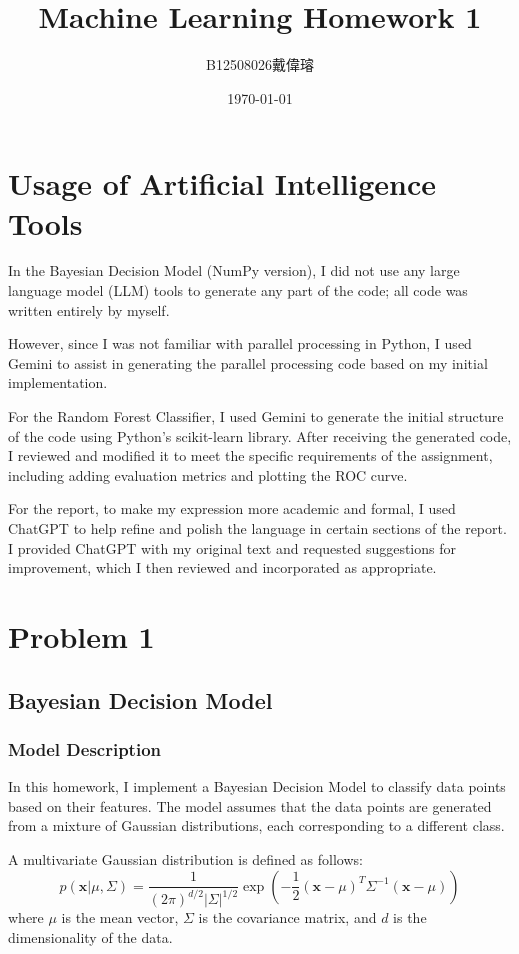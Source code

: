 \documentclass[12pt,a4paper]{article}
\title{Machine Learning Homework 1}
\author{B12508026戴偉璿}
\date{\today}
\begin{document}
\maketitle

\newpage
\tableofcontents
\newpage
\section*{Usage of Artificial Intelligence Tools}
In the Bayesian Decision Model (NumPy version), I did not use any large language model (LLM) tools to generate any part of the code; all code was written entirely by myself.

However, since I was not familiar with parallel processing in Python, I used Gemini to assist in generating the parallel processing code based on my initial implementation.

For the Random Forest Classifier, I used Gemini to generate the initial structure of the code using Python's scikit-learn library. After receiving the generated code, I reviewed and modified it to meet the specific requirements of the assignment, including adding evaluation metrics and plotting the ROC curve.

For the report, to make my expression more academic and formal, I used ChatGPT to help refine and polish the language in certain sections of the report. I provided ChatGPT with my original text and requested suggestions for improvement, which I then reviewed and incorporated as appropriate.

\section{Problem 1}

\subsection{Bayesian Decision Model}
\subsubsection{Model Description}
In this homework, I implement a Bayesian Decision Model to classify data points based on their features. The model assumes that the data points are generated from a mixture of Gaussian distributions, each corresponding to a different class.

A multivariate Gaussian distribution is defined as follows:
$$
p(\mathbf{x}|\mu, \Sigma) = \frac{1}{(2\pi)^{d/2} |\Sigma|^{1/2}} \exp\left(-\frac{1}{2}(\mathbf{x}-\mu)^T \Sigma^{-1} (\mathbf{x}-\mu)\right)
$$
where $\mu$ is the mean vector, $\Sigma$ is the covariance matrix, and $d$ is the dimensionality of the data.
\end{document}
